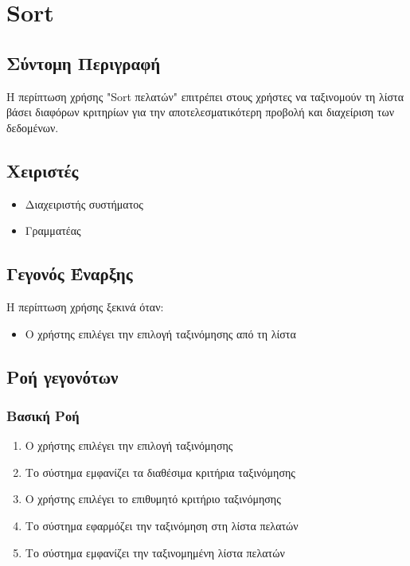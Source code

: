 \documentclass[12pt,a4paper,twoside]{book}
\begin{document}

\section{Sort}

\subsection{Σύντομη Περιγραφή}
Η περίπτωση χρήσης "Sort πελατών" επιτρέπει στους χρήστες να ταξινομούν τη λίστα  βάσει διαφόρων κριτηρίων για την αποτελεσματικότερη προβολή και διαχείριση των δεδομένων. %

\subsection{Χειριστές}
\begin{itemize}
  \item Διαχειριστής συστήματος
  \item Γραμματέας
\end{itemize}

\subsection{Γεγονός Έναρξης}
Η περίπτωση χρήσης ξεκινά όταν:
\begin{itemize}
  \item Ο χρήστης επιλέγει την επιλογή ταξινόμησης από τη λίστα %
\end{itemize}

\subsection{Ροή γεγονότων}

\subsubsection{Βασική Ροή}
\begin{enumerate}
  \item Ο χρήστης επιλέγει την επιλογή ταξινόμησης
  \item Το σύστημα εμφανίζει τα διαθέσιμα κριτήρια ταξινόμησης %
  \item Ο χρήστης επιλέγει το επιθυμητό κριτήριο ταξινόμησης
  \item Το σύστημα εφαρμόζει την ταξινόμηση στη λίστα πελατών
  \item Το σύστημα εμφανίζει την ταξινομημένη λίστα πελατών
\end{enumerate}
\end{document}
